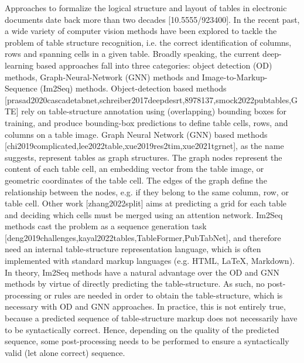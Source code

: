 \documentclass[11pt,a4paper]{article}
\begin{document}
Approaches to formalize the logical structure and layout of tables in electronic documents date back more than two decades [10.5555/923400]. In the recent past, a wide variety of computer vision methods have been explored to tackle the problem of table structure recognition, i.e. the correct identification of columns, rows and spanning cells in a given table. Broadly speaking, the current deep-learning based approaches fall into three categories: object detection (OD) methods, Graph-Neural-Network (GNN) methods and Image-to-Markup-Sequence (Im2Seq) methods. Object-detection based methods [prasad2020cascadetabnet,schreiber2017deepdesrt,8978137,smock2022pubtables,GTE] rely on table-structure annotation using (overlapping) bounding boxes for training, and produce bounding-box predictions to define table cells, rows, and columns on a table image. Graph Neural Network (GNN) based methods [chi2019complicated,lee2022table,xue2019res2tim,xue2021tgrnet], as the name suggests, represent tables as graph structures. The graph nodes represent the content of each table cell, an embedding vector from the table image, or geometric coordinates of the table cell. The edges of the graph define the relationship between the nodes, e.g. if they belong to the same column, row, or table cell. Other work [zhang2022split] aims at predicting a grid for each table and deciding which cells must be merged using an attention network. Im2Seq methods cast the problem as a sequence generation task [deng2019challenges,kayal2022tables,TableFormer,PubTabNet], and therefore need an internal table-structure representation language, which is often implemented with standard markup languages (e.g. HTML, LaTeX, Markdown). In theory, Im2Seq methods have a natural advantage over the OD and GNN methods by virtue of directly predicting the table-structure. As such, no post-processing or rules are needed in order to obtain the table-structure, which is necessary with OD and GNN approaches. In practice, this is not entirely true, because a predicted sequence of table-structure markup does not necessarily have to be syntactically correct. Hence, depending on the quality of the predicted sequence, some post-processing needs to be performed to ensure a syntactically valid (let alone correct) sequence.
\end{document}
